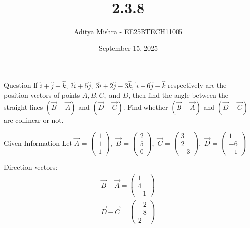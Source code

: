 \documentclass{beamer}
\title{2.3.8}
\author{Aditya Mishra - EE25BTECH11005}
\date{September 15, 2025}
\begin{document}
\frame{\titlepage}
\begin{frame}{Question}
If $\hat{i} + \hat{j} + \hat{k},\ 2\hat{i} + 5\hat{j},\ 3\hat{i} + 2\hat{j} - 3\hat{k},\ \hat{i} - 6\hat{j} - \hat{k}$ respectively are the position vectors of points $A, B, C,$ and $D$, then find the angle between the straight lines $(\vec{B}-\vec{A})$ and $(\vec{D}-\vec{C})$. Find whether $(\vec{B}-\vec{A})$ and $(\vec{D}-\vec{C})$ are collinear or not.
\end{frame}
\begin{frame}{Given Information}
\centering
\label{tab:parameters}
Let $\vec{A}$ = $\begin{pmatrix}1\\1\\1\end{pmatrix}$,\ 
$\vec{B}$ = $\begin{pmatrix}2\\5\\0\end{pmatrix}$,\
$\vec{C}$ = $\begin{pmatrix}3\\2\\-3\end{pmatrix}$,\
$\vec{D}$ = $\begin{pmatrix}1\\-6\\-1\end{pmatrix}$

Direction vectors:
\begin{align}
\vec{B}-\vec{A} = \begin{pmatrix}1\\4\\-1\end{pmatrix} \\
\vec{D}-\vec{C} = \begin{pmatrix}-2\\-8\\2\end{pmatrix}
\end{align}
\end{frame}
\end{document}
